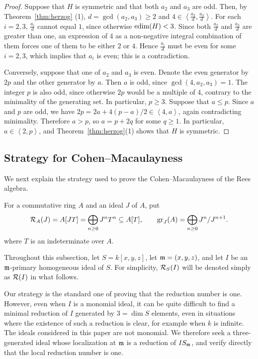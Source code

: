 \begin{proof}
	Suppose that $H$ is symmetric and that both $a_2$ and $a_3$ are odd. 
	Then, by Theorem~\ref{thm:herzog} (1), $d = \gcd(a_2, a_3) \ge 2$ and $4 \in \left<\frac{a_2}{d}, \frac{a_3}{d}\right>$. For each $i=2,3$, $\frac{a_i}{d}$ cannot equal $1$, since otherwise $\operatorname{edim}(H) < 3$. 
	Since both $\frac{a_2}{d}$ and $\frac{a_3}{d}$ are greater than one, an expression of $4$ as a non-negative integral combination of them forces one of them to be either $2$ or $4$. 
	Hence $\frac{a_i}{d}$ must be even for some $i=2,3$, which implies that $a_i$ is even; this is a contradiction.

	Conversely, suppose that one of $a_2$ and $a_3$ is even.  Denote the even
	generator by $2p$ and the other generator by $a$.  Then $a$ is odd, since
	$\gcd(4,a_2,a_3)=1$.  The integer $p$ is also odd, since otherwise $2p$
	would be a multiple of $4$, contrary to the minimality of the generating
	set.  In particular, $p\geq3$.
	Suppose that $a\leq p$.  Since $a$ and $p$ are odd, we have
	$2p=2a+4(p-a)/2\in\left<4,a\right>$, again contradicting minimality.
	Therefore $a>p$, so $a=p+2q$ for some $q\geq1$.  In particular,
	$a\in\left<2,p\right>$, and Theorem~\ref{thm:herzog}(1) shows that $H$ is
	symmetric.
\end{proof}


\subsection{Strategy for Cohen--Macaulayness}
\label{subsec:cm-strategy}


We next explain the strategy used to prove the Cohen--Macaulayness of the Rees algebra.


For a commutative ring $A$ and an ideal $J$ of $A$, put
$$
\mathcal R_A(J)=A[JT]=\bigoplus_{n\geq0}J^nT^n\subseteq A[T], \qquad \operatorname{gr}_J(A)=\bigoplus_{n\geq0}J^n/J^{n+1}.
$$
where $T$ is an indeterminate over $A$.

Throughout this subsection, let $S=k[x,y,z]$, let $\mathfrak m=(x,y,z)$, and let $I$ be an $\mathfrak m$-primary homogeneous ideal of $S$. 
For simplicity, $\mathcal R_S(I)$ will be denoted simply as $\mathcal R(I)$ in what follows.


Our strategy is the standard one of proving that the reduction number is one.  
However, even when $I$ is a monomial ideal, it can be quite difficult to find a minimal reduction of $I$ generated by $3=\dim S$ elements, even in situations where the existence of such a reduction is clear, for example when $k$ is infinite. The ideals considered in this paper are not monomial.
We therefore seek a three-generated ideal whose localization at $\mathfrak m$ is a reduction of $IS_\mathfrak m$, and verify directly that the local reduction number is one.

